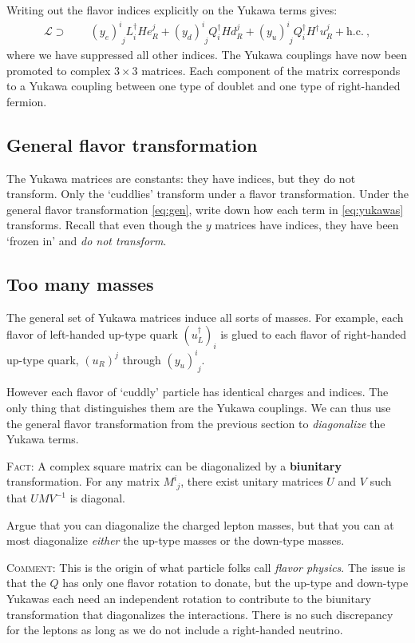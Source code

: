 \documentclass[12pt]{article}
\numberwithin{equation}{section}    %
\begin{document}
Writing out the flavor indices explicitly on the Yukawa terms gives:
\begin{align}
	\mathcal L \supset  &
	\phantom{+}
	(y_e)^i_{\phantom{i}j} L^\dag_i H e_R^j
	+
	(y_d)^i_{\phantom{i}j} Q^\dag_i H d_R^j
	+
	(y_u)^i_{\phantom{i}j} Q^\dag_i H^\dag u_R^j
	+ \text{h.c.} \ ,
	\label{eq:yukawas}
\end{align}
where we have suppressed all other indices. The Yukawa couplings have now been promoted to complex $3\times 3$ matrices. Each component of the matrix corresponds to a Yukawa coupling between one type of doublet and one type of right-handed fermion.

\subsection{General flavor transformation}

The Yukawa matrices are constants: they have indices, but they do not transform. Only the `cuddlies' transform under a flavor transformation. Under the general flavor transformation \eqref{eq:gen}, write down how each term in \eqref{eq:yukawas} transforms. Recall that even though the $y$ matrices have indices, they have been `frozen in' and \emph{do not transform}.

\subsection{Too many masses}

The general set of Yukawa matrices induce all sorts of masses. For example, each flavor of left-handed up-type quark $(u_L^\dag)_i$ is glued to each flavor of right-handed up-type quark, $(u_R)^j$ through $(y_u)^i_{\phantom{i}j}$. 

However each flavor of `cuddly' particle has identical charges and indices. The only thing that distinguishes them are the Yukawa couplings. We can thus use the general flavor transformation from the previous section to \emph{diagonalize} the Yukawa terms. 

\textsc{Fact}: A complex square matrix can be diagonalized by a \textbf{biunitary} transformation. For any matrix $M^i_{\phantom{i}j}$, there exist unitary matrices $U$ and $V$ such that $UMV^{-1}$ is diagonal.

Argue that you can diagonalize the charged lepton masses, but that you can at most diagonalize \emph{either} the up-type masses or the down-type masses.

\textsc{Comment}: This is the origin of what particle folks call \emph{flavor physics}. The issue is that the $Q$ has only one flavor rotation to donate, but the up-type and down-type Yukawas each need an independent rotation to contribute to the biunitary transformation that diagonalizes the interactions. There is no such discrepancy for the leptons as long as we do not include a right-handed neutrino. 
\end{document}

